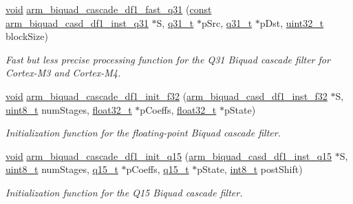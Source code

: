 \begin{DoxyCompactItemize}
\hyperlink{group___n_a_m_e_ga18028b8badbf1ea7e704ccac3c488e82}{void} \hyperlink{group___biquad_cascade_d_f1_ga456390f5e448afad3a38bed7d6e380e3}{arm\-\_\-biquad\-\_\-cascade\-\_\-df1\-\_\-fast\-\_\-q31} (\hyperlink{group___n_a_m_e_ga7ae6d0e43244213b34de2c2b9aa30da6}{const} \hyperlink{structarm__biquad__casd__df1__inst__q31}{arm\-\_\-biquad\-\_\-casd\-\_\-df1\-\_\-inst\-\_\-q31} $\ast$S, \hyperlink{arm__math_8h_adc89a3547f5324b7b3b95adec3806bc0}{q31\-\_\-t} $\ast$p\-Src, \hyperlink{arm__math_8h_adc89a3547f5324b7b3b95adec3806bc0}{q31\-\_\-t} $\ast$p\-Dst, \hyperlink{stdint_8h_a435d1572bf3f880d55459d9805097f62}{uint32\-\_\-t} block\-Size)
\begin{DoxyCompactList}\small\item\em Fast but less precise processing function for the Q31 Biquad cascade filter for Cortex-\/\-M3 and Cortex-\/\-M4. \end{DoxyCompactList}\item 
\hyperlink{group___n_a_m_e_ga18028b8badbf1ea7e704ccac3c488e82}{void} \hyperlink{group___biquad_cascade_d_f1_ga8e73b69a788e681a61bccc8959d823c5}{arm\-\_\-biquad\-\_\-cascade\-\_\-df1\-\_\-init\-\_\-f32} (\hyperlink{structarm__biquad__casd__df1__inst__f32}{arm\-\_\-biquad\-\_\-casd\-\_\-df1\-\_\-inst\-\_\-f32} $\ast$S, \hyperlink{stdint_8h_aba7bc1797add20fe3efdf37ced1182c5}{uint8\-\_\-t} num\-Stages, \hyperlink{arm__math_8h_a4611b605e45ab401f02cab15c5e38715}{float32\-\_\-t} $\ast$p\-Coeffs, \hyperlink{arm__math_8h_a4611b605e45ab401f02cab15c5e38715}{float32\-\_\-t} $\ast$p\-State)
\begin{DoxyCompactList}\small\item\em Initialization function for the floating-\/point Biquad cascade filter. \end{DoxyCompactList}\item 
\hyperlink{group___n_a_m_e_ga18028b8badbf1ea7e704ccac3c488e82}{void} \hyperlink{group___biquad_cascade_d_f1_gad54c724132f6d742a444eb6df0e9c731}{arm\-\_\-biquad\-\_\-cascade\-\_\-df1\-\_\-init\-\_\-q15} (\hyperlink{structarm__biquad__casd__df1__inst__q15}{arm\-\_\-biquad\-\_\-casd\-\_\-df1\-\_\-inst\-\_\-q15} $\ast$S, \hyperlink{stdint_8h_aba7bc1797add20fe3efdf37ced1182c5}{uint8\-\_\-t} num\-Stages, \hyperlink{arm__math_8h_ab5a8fb21a5b3b983d5f54f31614052ea}{q15\-\_\-t} $\ast$p\-Coeffs, \hyperlink{arm__math_8h_ab5a8fb21a5b3b983d5f54f31614052ea}{q15\-\_\-t} $\ast$p\-State, \hyperlink{stdint_8h_ad566f6541e98b74246db1a3a3a85ad49}{int8\-\_\-t} post\-Shift)
\begin{DoxyCompactList}\small\item\em Initialization function for the Q15 Biquad cascade filter. \end{DoxyCompactList}\item 

\end{DoxyCompactItemize}
